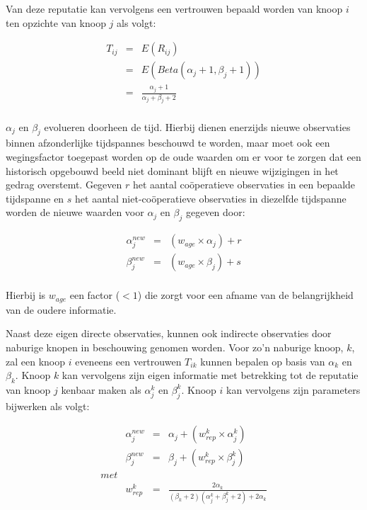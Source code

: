 Van deze reputatie kan vervolgens een vertrouwen bepaald worden van knoop $i$
ten opzichte van knoop $j$ als volgt: 

\begin{equation} \label{eq:reputation-trust}
\begin{array}{rcl}
T_{ij} & = & E(R_{ij}) \\
       & = & E(Beta(\alpha_j+1, \beta_j+1)) \\
       & = & \frac{\alpha_j+1}{\alpha_j+\beta_j+2} \\
\end{array}
\end{equation}

$\alpha_j$ en $\beta_j$ evolueren doorheen de tijd. Hierbij dienen enerzijds
nieuwe observaties binnen afzonderlijke tijdspannes beschouwd te worden, maar
moet ook een wegingsfactor toegepast worden op de oude waarden om er voor te
zorgen dat een historisch opgebouwd beeld niet dominant blijft en nieuwe
wijzigingen in het gedrag overstemt. Gegeven $r$ het aantal co\"operatieve
observaties in een bepaalde tijdspanne en $s$ het aantal niet-co\"operatieve
observaties in diezelfde tijdspanne worden de nieuwe waarden voor $\alpha_j$ en
$\beta_j$ gegeven door:

\begin{equation} \label{eq:reputation-update-direct}
\begin{array}{rcl}
\alpha^{new}_j & = & (w_{age} \times \alpha_j) + r \\
\beta^{new}_j  & = & (w_{age} \times \beta_j) + s \\
\end{array}
\end{equation}

Hierbij is $w_{age}$ een factor ($< 1$) die zorgt voor een afname van de
belangrijkheid van de oudere informatie.

Naast deze eigen directe observaties, kunnen ook indirecte observaties door
naburige knopen in beschouwing genomen worden. Voor zo'n naburige knoop, $k$,
zal een knoop $i$ eveneens een vertrouwen $T_{ik}$ kunnen bepalen op basis van
$\alpha_k$ en $\beta_k$. Knoop $k$ kan vervolgens zijn eigen informatie met
betrekking tot de reputatie van knoop $j$ kenbaar maken als $\alpha^k_j$ en
$\beta^k_j$. Knoop $i$ kan vervolgens zijn parameters bijwerken als volgt:

\begin{equation} \label{eq:reputation-update-indirect}
\begin{array}{rrcl}
& \alpha^{new}_j & = & \alpha_j + ( w^k_{rep} \times \alpha^k_j ) \\
& \beta^{new}_j  & = & \beta_j  + ( w^k_{rep} \times \beta^k_j )  \\
met \\
& w^k_{rep}      & = & \frac{2 \alpha_k}{(\beta_k+2) (\alpha^k_j+\beta^k_j+2)+2 \alpha_k} \\
\end{array}
\end{equation}

